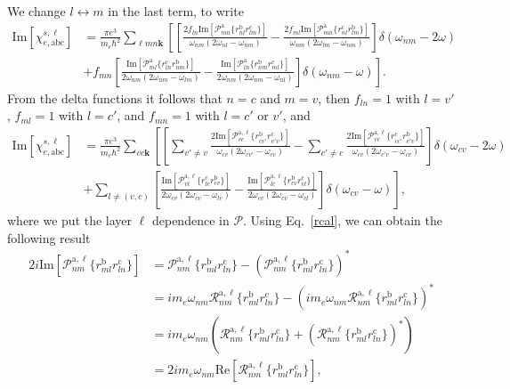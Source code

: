 We change $l\leftrightarrow m$ in the last term,
to write
\begin{align}\label{imchie2}
\mathrm{Im}[\chi_{e,\mathrm{a}\mathrm{b}\mathrm{c}}^{s,\ell}]
&=
\frac{\pi e^3}{m_e\hbar^2} 
\sum_{\ell m n\mathbf{k}}
\left[
\left[
\frac{2 f_{ln}\mathrm{Im}[\mathcal{P}^{\mathrm{a}}_{mn}\{r^{\mathrm{b}}_{nl}r^{\mathrm{c}}_{lm}\}]
}{\omega_{nm}(2\omega_{nl}-\omega_{nm})}
-\frac{2 f_{ml}\mathrm{Im}[\mathcal{P}^{\mathrm{a}}_{mn}\{r^{\mathrm{c}}_{nl}r^{\mathrm{b}}_{lm}\}]}
{\omega_{nm}(2\omega_{lm}-\omega_{nm})}
\right]
\delta(\omega_{nm}-2\omega)
\right.
\nonumber\\
&+
\left. 
f_{mn}
\left[
\frac{\mathrm{Im}[\mathcal{P}^{\mathrm{a}}_{ml}\{r^{\mathrm{c}}_{ln}r^{\mathrm{b}}_{nm}\}]}
{2\omega_{nm}(2\omega_{nm}-\omega_{lm})}
-
\frac{\mathrm{Im}[\mathcal{P}^{\mathrm{a}}_{ln}\{r^{\mathrm{b}}_{nm}r^{\mathrm{c}}_{ml}\}]}
{2\omega_{nm}(2\omega_{nm}-\omega_{nl})}
\right]
\delta(\omega_{nm}-\omega)
\right]
.
\end{align}  
From the delta functions it follows that $n=c$ and $m=v$, then
$f_{ln}=1$ with $l=v'$,
$f_{ml}=1$ with $l=c'$, 
and
$f_{mn}=1$ with $l=c'$ or $v'$, and
\begin{align}\label{imchie3}
\mathrm{Im}[\chi_{e,\mathrm{a}\mathrm{b}\mathrm{c}}^{s,\ell}]
&=
\frac{\pi e^3}{m_e\hbar^2} 
\sum_{vc\mathbf{k}}
\left[
\left[
\sum_{v'\ne v}
\frac{2\mathrm{Im}[\mathcal{P}^{\mathrm{a},\ell}_{vc}\{r^{\mathrm{b}}_{cv'}r^{\mathrm{c}}_{v'v}\}]
}{\omega_{cv}(2\omega_{cv'}-\omega_{cv})}
-
\sum_{c'\ne c}
\frac{2\mathrm{Im}[\mathcal{P}^{\mathrm{a},\ell}_{vc}\{r^{\mathrm{c}}_{cc'}r^{\mathrm{b}}_{c'v}\}]}
{\omega_{cv}(2\omega_{c'v}-\omega_{cv})}
\right]
\delta(\omega_{cv}-2\omega)
\right.
\nonumber\\
&+
\left.
\sum_{l\neq(v,c)}
\left[
\frac{\mathrm{Im}[\mathcal{P}^{\mathrm{a},\ell}_{vl}\{r^{\mathrm{c}}_{lc}r^{\mathrm{b}}_{cv}\}]}
{2\omega_{cv}(2\omega_{cv}-\omega_{lv})}
-
\frac{\mathrm{Im}[\mathcal{P}^{\mathrm{a},\ell}_{lc}\{r^{\mathrm{b}}_{cv}r^{\mathrm{c}}_{vl}\}]}
{2\omega_{cv}(2\omega_{cv}-\omega_{cl})}
\right]
\delta(\omega_{cv}-\omega)
\right]
,
\end{align}  
where we put the layer $\ell$ dependence in $\mathcal{P}$.
Using Eq.~\eqref{rcal}, we can obtain the following result
\begin{align}\label{ptor}
2i\mathrm{Im}[\mathcal{P}^{\mathrm{a},\ell}_{nm}\{r^{\mathrm{b}}_{ml}r^{\mathrm{c}}_{ln}\}]
&=
\mathcal{P}^{\mathrm{a},\ell}_{nm}\{r^{\mathrm{b}}_{ml}r^{\mathrm{c}}_{ln}\}
-
(\mathcal{P}^{\mathrm{a},\ell}_{nm}\{r^{\mathrm{b}}_{ml}r^{\mathrm{c}}_{ln}\})^*
\nonumber\\
&=
im_e\omega_{nm}\mathcal{R}^{\mathrm{a},\ell}_{nm}\{r^{\mathrm{b}}_{ml}r^{\mathrm{c}}_{ln}\}
-
(im_e\omega_{nm}\mathcal{R}^{\mathrm{a},\ell}_{nm}\{r^{\mathrm{b}}_{ml}r^{\mathrm{c}}_{ln}\})^*
\nonumber\\
&=
im_e\omega_{nm}\left(\mathcal{R}^{\mathrm{a},\ell}_{nm}\{r^{\mathrm{b}}_{ml}r^{\mathrm{c}}_{ln}\}
+
(\mathcal{R}^{\mathrm{a},\ell}_{nm}\{r^{\mathrm{b}}_{ml}r^{\mathrm{c}}_{ln}\})^*
\right)
\nonumber\\
&=
2im_e\omega_{nm}\mathrm{Re}[\mathcal{R}^{\mathrm{a},\ell}_{nm}\{r^{\mathrm{b}}_{ml}r^{\mathrm{c}}_{ln}\}]
,
\end{align}
